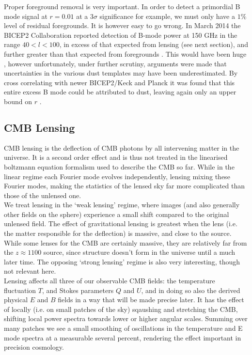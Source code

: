\documentclass[a4paper,10pt]{article}
\begin{document}
Proper foreground removal is very important. In order to detect a primordial B mode signal at $r=0.01$ at a $3\sigma$ significance for example, we must only have a $1\%$ level of residual foregrounds. It is however easy to go wrong. In March 2014 the BICEP2 Collaboration reported detection of B-mode power at 150 GHz in the range $40<l<100$, in excess of that expected from lensing (see next section), and further greater than that expected from foregrounds \cite{bicep2cockup}. This would have been huge \cite{smokinggun}, however unfortunately, under further scrutiny, arguments were made that uncertainties in the various dust templates may have been underestimated. By cross correlating with newer BICEP2/Keck and Planck it was found that this entire excess B mode could be attributed to dust, leaving again only an upper bound on $r$ \cite{bicep2cockup2}.


\subsection{CMB Lensing}
CMB lensing is the deflection of CMB photons by all intervening matter in the universe. It is a second order effect and is thus not treated in the linearised boltzmann equation formalism used to describe the CMB so far. While in the linear regime each Fourier mode evolves independently, lensing mixing these Fourier modes, making the statistics of the lensed sky far more complicated than those of the unlensed one. \\

We treat lensing in the `weak lensing' regime, where images (and also generally other fields on the sphere) experience a small shift compared to the original unlensed field. The effect of gravitational lensing is greatest when the lens (i.e. the matter responsible for the deflection) is massive, and close to the source. While some lenses for the CMB are certainly massive, they are relatively far from the $z\approx1100$ source, since structure doesn't form in the universe until a much later time. The opposing `strong lensing' regime is also very interesting, though not relevant here.\\

Lensing affects all three of our observable CMB fields: the temperature fluctuation $T$, and Stokes parameters $Q$ and $U$, and in doing so also the derived physical $E$ and $B$ fields in a way that will be made precise later. It has the effect of locally (i.e. on small patches of the sky) sqaushing and stretching the CMB, shifting local power spectra towards lower or higher angular scales. Summing over many patches we see a small smoothing of oscillations in the temperature and E mode spectra at a measurable several percent, rendering the effect important in precision cosmology. \\
\end{document}
